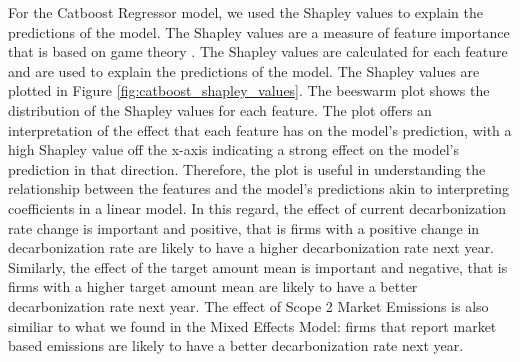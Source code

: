 For the Catboost Regressor model, we used the Shapley values to explain the predictions of the model. The Shapley values are a measure of feature importance that is based on game theory \cite{NIPS2017_7062}. The Shapley values are calculated for each feature and are used to explain the predictions of the model. The Shapley values are plotted in Figure \ref{fig:catboost_shapley_values}. The beeswarm plot shows the distribution of the Shapley values for each feature. The plot offers an interpretation of the effect that each feature has on the model's prediction, with a high Shapley value off the x-axis indicating a strong effect on the model's prediction in that direction. Therefore, the plot is useful in understanding the relationship between the features and the model's predictions akin to interpreting coefficients in a linear model. In this regard, the effect of current decarbonization rate change is important and positive, that is firms with a positive change in decarbonization rate are likely to have a higher decarbonization rate next year. Similarly, the effect of the target amount mean is important and negative, that is firms with a higher target amount mean are likely to have a better decarbonization rate next year. The effect of Scope 2 Market Emissions is also similiar to what we found in the Mixed Effects Model: firms that report market based emissions are likely to have a better decarbonization rate next year. 





